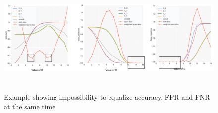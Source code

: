 \begin{figure}[htbp]
	\begin{center}
		\includegraphics[width=7in,height=2.2in]{impossibility.png} 
        \setlength{\belowcaptionskip}{-8pt} 
		\caption{Example showing impossibility to equalize accuracy, FPR and FNR at the same time}
		\label{impossibility}
	\end{center}
\end{figure}

